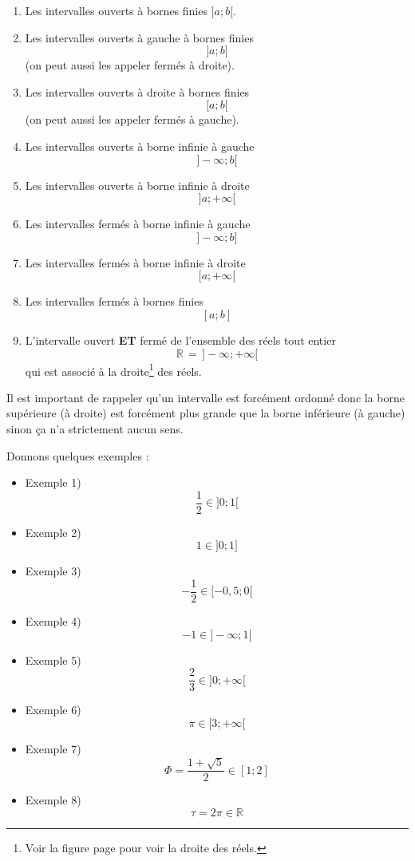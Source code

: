 \documentclass[a4paper,11pt]{book}
\begin{document}
\begin{enumerate}
\item Les intervalles ouverts à
bornes finies \(]a ; b[\).
\item Les intervalles ouverts à gauche à bornes finies
\[]a ; b]\]
(on peut aussi les appeler fermés à droite).
\item Les intervalles ouverts à droite à bornes finies
\[[a ; b[\]
(on peut aussi les appeler fermés à gauche).
\item Les intervalles ouverts à borne infinie à gauche
\[]-\infty ; b[\]
\item Les intervalles ouverts à borne infinie à droite
\[]a ; +\infty[\]
\item Les intervalles fermés à borne infinie à
gauche
\[]-\infty ; b]\]
\item Les intervalles fermés à borne infinie à droite
\[[a ; +\infty[\]
\item Les intervalles fermés à bornes finies
\[[a ; b]\]
\item L'intervalle ouvert \textbf{ET} fermé de l'ensemble des
réels tout entier
\[\mathbb{R}\,=\,]-\infty ; +\infty[\] qui est associé à la
droite\footnote{Voir la figure page \pageref{page:real-line} pour voir
la droite des réels.} des réels.
\end{enumerate}


Il est important de rappeler qu'un intervalle est
forcément ordonné donc la borne supérieure (à
droite) est forcément plus grande que la borne
inférieure (à gauche) sinon ça n'a strictement
aucun sens.

Donnons quelques exemples :
\begin{itemize}
\item Exemple 1) \[\dfrac{1}{2} \in ]0 ; 1[\]
\item Exemple 2) \[1 \in ]0 ; 1]\]
\item Exemple 3) \[-\dfrac{1}{2} \in [-0,5 ; 0[\]
\item Exemple 4) \[-1 \in ]-\infty ; 1[\]
\item Exemple 5) \[\dfrac{2}{3} \in ]0 ; +\infty[\]
\item Exemple 6) \[\pi \in [3 ; +\infty[\]
\item Exemple 7) \[\Phi = \dfrac{1 + \sqrt{5}}{2} \in [1 ; 2]\]
\item Exemple 8) \[\tau = 2\pi \in \mathbb{R}\]
\end{itemize}
\end{document}
